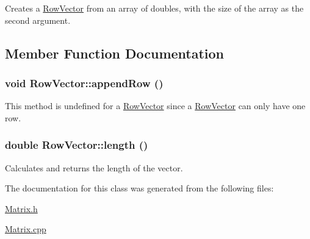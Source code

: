 Creates a \hyperlink{class_row_vector}{RowVector} from an array of doubles, with the size of the array as the second argument. 



\subsection{Member Function Documentation}
\hypertarget{class_row_vector_aa04552c6bdfed758bc06815d8696b44c}{
\subsubsection[{appendRow}]{\setlength{\rightskip}{0pt plus 5cm}void RowVector::appendRow ()}}
\label{class_row_vector_aa04552c6bdfed758bc06815d8696b44c}


This method is undefined for a \hyperlink{class_row_vector}{RowVector} since a \hyperlink{class_row_vector}{RowVector} can only have one row. 

\hypertarget{class_row_vector_a5c2dde299464fd200026db5515480275}{
\subsubsection[{length}]{\setlength{\rightskip}{0pt plus 5cm}double RowVector::length ()}}
\label{class_row_vector_a5c2dde299464fd200026db5515480275}


Calculates and returns the length of the vector. 



The documentation for this class was generated from the following files:\begin{DoxyCompactItemize}
\item 
\hyperlink{_matrix_8h}{Matrix.h}\item 
\hyperlink{_matrix_8cpp}{Matrix.cpp}\end{DoxyCompactItemize}
